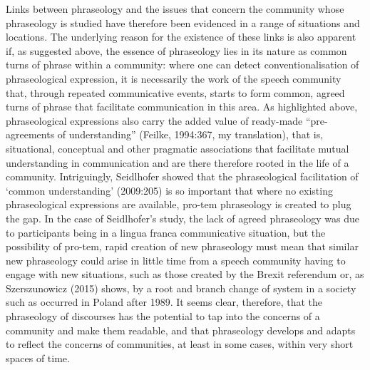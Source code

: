 \documentclass[12pt]{article}
\newenvironment{styleStandard}{\setlength\leftskip{0cm}\setlength\rightskip{0cm plus 1fil}\setlength\parindent{0cm}\setlength\parfillskip{0pt plus 1fil}\setlength\parskip{0in plus 1pt}\writerlistparindent\writerlistleftskip\leavevmode\normalfont\normalsize\writerlistlabel\ignorespaces}{\unskip\vspace{0.111in plus 0.0111in}\par}
\newcommand\writerlistleftskip{}
\newcommand\writerlistparindent{}
\newcommand\writerlistlabel{}
\begin{document}
\begin{styleStandard}
Links between phraseology and the issues that concern the community whose phraseology is studied have therefore been evidenced in a range of situations and locations. The underlying reason for the existence of these links is also apparent if, as suggested above, the essence of phraseology lies in its nature as common turns of phrase within a community: where one can detect conventionalisation of phraseological expression, it is necessarily the work of the speech community that, through repeated communicative events, starts to form common, agreed turns of phrase that facilitate communication in this area. As highlighted above, phraseological expressions also carry the added value of ready-made “pre-agreements of understanding” (Feilke, 1994:367, my translation), that is, situational, conceptual and other pragmatic associations that facilitate mutual understanding in communication and are there therefore rooted in the life of a community. Intriguingly, Seidlhofer showed that the phraseological facilitation of ‘common understanding’ (2009:205) is so important that where no existing phraseological expressions are available, pro-tem phraseology is created to plug the gap. In the case of Seidlhofer’s study, the lack of agreed phraseology was due to participants being in a lingua franca communicative situation, but the possibility of pro-tem, rapid creation of new phraseology must mean that similar new phraseology could arise in little time from a speech community having to engage with new situations, such as those created by the Brexit referendum or, as Szerszunowicz (2015) shows, by a root and branch change of system in a society such as occurred in Poland after 1989. It seems clear, therefore, that the phraseology of discourses has the potential to tap into the concerns of a community and make them readable, and that phraseology develops and adapts to reflect the concerns of communities, at least in some cases, within very short spaces of time.
\end{styleStandard}
\end{document}
